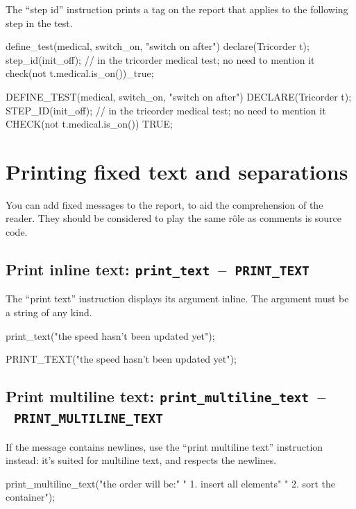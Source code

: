 \documentclass[twoside, a4paper, article]{memoir}
\newcommand*\testudocolor{\color{red!80!blue}}
\newcommand*\testudo[1]{\texttt{\testudocolor{}#1}}
\newcommand*\testudopair[2]{\testudo{#1}~--~\testudo{#2}}
\newcommand\subsectiontestudopair[3]{%
  \subsection[#1]{#1: \testudopair{#2}{#3}}}
\begin{document}
The ``step id'' instruction prints a tag on the report that applies to the
following step in the test.
\begin{cpplisting}
define_test(medical, switch_on, "switch on after") {
  declare(Tricorder t);
  step_id(init_off); // in the tricorder medical test; no need to mention it
  check(not t.medical.is_on())_true;
}
\end{cpplisting}

\begin{cpplisting}
DEFINE_TEST(medical, switch_on, "switch on after") {
  DECLARE(Tricorder t);
  STEP_ID(init_off); // in the tricorder medical test; no need to mention it
  CHECK(not t.medical.is_on()) TRUE;
}
\end{cpplisting}


\section{Printing fixed text and separations}
\label{sec:printing-text-separations}

You can add fixed messages to the report, to aid the comprehension of the
reader.  They should be considered to play the same rôle as comments is source
code.

\subsectiontestudopair{Print inline text}{print\_text}{PRINT\_TEXT}
\label{sec:print-inline-text}

The ``print text'' instruction displays its argument inline.  The argument must
be a string of any kind.

\begin{cpplisting}
print_text("the speed hasn't been updated yet");
\end{cpplisting}

\begin{cpplisting}
PRINT_TEXT("the speed hasn't been updated yet");
\end{cpplisting}


\subsectiontestudopair{Print multiline text}%
  {print\_multiline\_text}{PRINT\_MULTILINE\_TEXT}
\label{sec:print-multiline-text}

If the message contains newlines, use the ``print multiline text'' instruction
instead: it's suited for multiline text, and respects the newlines.

\begin{cpplisting}
print_multiline_text("the order will be:\n"
                     "  1. insert all elements\n"
                     "  2. sort the container");
\end{cpplisting}
\end{document}
